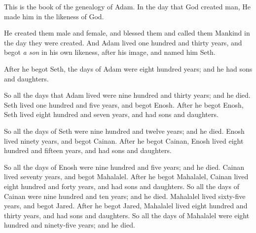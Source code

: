 

\bverse This is the book of the genealogy of Adam. In the day that God created man, He made him in the likeness of God.

\bverse He created them male and female, and blessed them and called them Mankind in the day they were created.
\bverse And Adam lived one hundred and thirty years, and begot \textit{a son} in his own likeness, after his image, and named him Seth.

\bverse After he begot Seth, the days of Adam were eight hundred years; and he had sons and daughters.

\bverse So all the days that Adam lived were nine hundred and thirty years; and he died.
\bverse Seth lived one hundred and five years, and begot Enosh.
\bverse After he begot Enosh, Seth lived eight hundred and seven years, and had sons and daughters.
	
\bverse So all the days of Seth were nine hundred and twelve years; and he died.
\bverse Enosh lived ninety years, and begot Cainan.
\bverse After he begot Cainan, Enosh lived eight hundred and fifteen years, and had sons and daughters.
	
\bverse So all the days of Enosh were nine hundred and five years; and he died.
\bverse Cainan lived seventy years, and begot Mahalalel.
\bverse After he begot Mahalalel, Cainan lived eight hundred and forty years, and had sons and daughters.
\bverse So all the days of Cainan were nine hundred and ten years; and he died.
\bverse Mahalalel lived sixty-five years, and begot Jared. After he begot Jared, Mahalalel lived eight hundred and thirty years, and had sons and daughters. So all the days of Mahalalel were eight hundred and ninety-five years; and he died.
\bverse 
\bverse 
\bverse 
\bverse 
\bverse 
\bverse 
\bverse 
\bverse 
\bverse 
\bverse 
\bverse 
\bverse 
\bverse 
\bverse 
\bverse 
\bverse 
\bverse 




